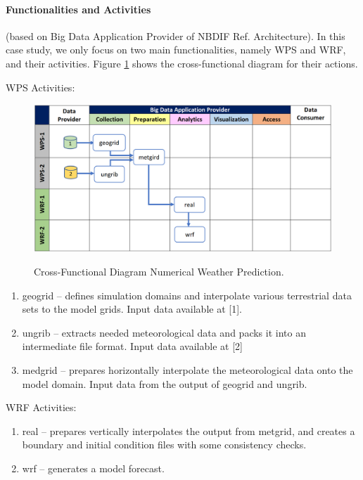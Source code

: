 \paragraph*{Functionalities and Activities} (based on Big Data Application Provider of NBDIF Ref. Architecture).
In this case study, we only focus on two main functionalities, namely
WPS and WRF, and their activities.  Figure \ref{fig:weather-2} shows
the cross-functional diagram for their actions.

WPS Activities:

\begin{figure}[htb]
\centering\includegraphics[width=1.0\columnwidth]{usecase/weather.png}
\label{fig:weather-2}
\caption{Cross-Functional Diagram Numerical Weather Prediction.}
\end{figure}

\begin{enumerate}
  
\item geogrid -- defines simulation domains and interpolate various terrestrial data sets to the
model grids. Input data available at [1].

\item ungrib -- extracts needed meteorological data and packs it into an intermediate file format.
Input data available at [2]

\item medgrid -- prepares horizontally interpolate the meteorological data onto the model domain.
  Input data from the output of geogrid and ungrib.

\end{enumerate}

WRF Activities:

\begin{enumerate}

\item real -- prepares vertically interpolates the output from metgrid, and creates a boundary and initial
condition files with some consistency checks.

\item wrf -- generates a model forecast.

\end{enumerate}

